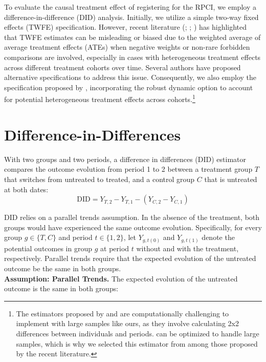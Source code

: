 \documentclass[10pt, oneside]{book}
\begin{document}
To evaluate the causal treatment effect of registering for the RPCI, we employ a difference-in-difference (DID) analysis. Initially, we utilize a simple two-way fixed effects (TWFE) specification. However, recent literature (\citealt{de2020two}; \citealt{callaway2021difference}; \citealt{sun2021estimating}) has highlighted that TWFE estimates can be misleading or biased due to the weighted average of average treatment effects (ATEs) when negative weights or non-rare forbidden comparisons are involved, especially in cases with heterogeneous treatment effects across different treatment cohorts over time. Several authors have proposed alternative specifications to address this issue. Consequently, we also employ the specification proposed by \cite{de2020two}, incorporating the robust dynamic option to account for potential heterogeneous treatment effects across cohorts.\footnote{The estimators proposed by \cite{callaway2021difference} and \cite{sun2021estimating} are computationally challenging to implement with large samples like ours, as they involve calculating 2x2 differences between individuals and periods. \cite{de2020two} can be optimized to handle large samples, which is why we selected this estimator from among those proposed by the recent literature.}  \\

\section{Difference-in-Differences}

With two groups and two periods, a difference in differences (DID) estimator compares the outcome evolution from period 1 to 2 between a treatment group $T$ that switches from untreated to treated, and a control group $C$ that is untreated at both dates: \\

$$\text{DID} = Y_{T,2} - Y_{T,1} - (Y_{C,2} - Y_{C,1})$$

DID relies on a parallel trends assumption. In the absence of the treatment, both groups would have experienced the same outcome evolution. Specifically, for every group $g \in \{T, C\}$ and period $t \in \{1, 2\}$, let $Y_{g,t(0)}$ and $Y_{g,t(1)}$ denote the potential outcomes in group $g$ at period $t$ without and with the treatment, respectively. Parallel trends require that the expected evolution of the untreated outcome be the same in both groups. \\

\textbf{Assumption: Parallel Trends.} The expected evolution of the untreated outcome is the same in both groups: 
\end{document}
